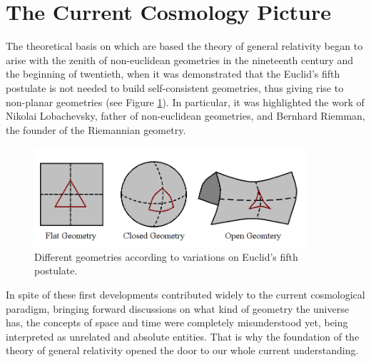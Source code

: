 



\section{The Current Cosmology Picture }
\label{sec:TheCurrentCosmologyPicture}


The theoretical basis on which are based the theory of general relativity
began to arise with the zenith of non-euclidean geometries in the 
nineteenth century and the beginning of twentieth, when it was demonstrated 
that the Euclid's fifth postulate is not needed to build self-consistent 
geometries, thus giving rise to non-planar geometries (see Figure 
\ref{fig:NonEuclidean}). In particular, it was highlighted the work of 
Nikolai Lobachevsky, father of non-euclidean geometries, and Bernhard 
Riemman, the founder of the Riemannian geometry.


\begin{figure}[htbp]
	\centering
	\includegraphics[width=0.9\textwidth]
	{./figures/1_introduction/Non_Euclidean.png}
	
	\caption{\small{Different geometries according to variations on	
	Euclid's fifth postulate.}}
	
	\label{fig:NonEuclidean}
\end{figure}


In spite of these first developments contributed widely to the current 
cosmological paradigm, bringing forward discussions on what kind of 
geometry the universe has, the concepts of space and time were completely 
misunderstood yet, being interpreted as unrelated and absolute entities.
That is why the foundation of the theory of general relativity opened the
door to our whole current understanding.


